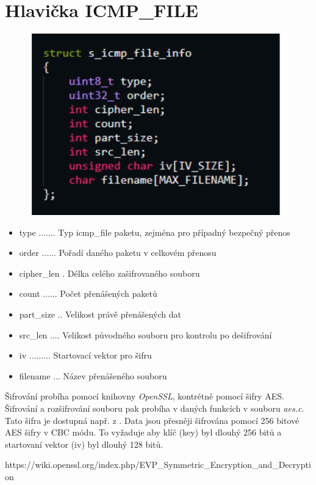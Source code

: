 \documentclass[a4paper, 11pt]{article}
\begin{document}
\section{Hlavička ICMP\_FILE}
\begin{figure}[h]
\includegraphics[scale=1.1]{img/struct.png}
\end{figure}
\begin{itemize}
\item type ....... Typ icmp_file paketu, zejména pro případný bezpečný přenos
\item order ...... Pořadí daného paketu v celkovém přenosu
\item cipher_len . Délka celého zašifrovaného souboru
\item count ...... Počet přenášených paketů
\item part_size .. Velikost právě přenášených dat
\item src_len .... Velikost původného souboru pro kontrolu po dešifrování
\item iv ......... Startovací vektor pro šifru
\item filename ... Název přenášeného souboru
\end{itemize}

Šifrování probíha pomocí knihovny \textit{OpenSSL}, kontrétně pomocí šifry AES. Šifrování a rozšifrování souboru pak probíha v daných funkcích v souboru \textit{aes.c}. Tato šifra je dostupná např. z \cite{aes}. Data jsou přesněji šifrována pomocí 256 bitové AES šifry v CBC módu. To vyžaduje aby klíč (key) byl dlouhý 256 bitů a startovaní vektor (iv) byl dlouhý 128 bitů.

\begin{thebibliography}{2}
https://wiki.openssl.org/index.php/EVP_Symmetric_Encryption_and_Decryption
\end{thebibliography}
\end{document}
